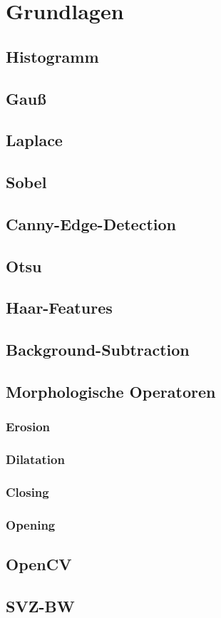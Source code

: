 \chapter{Grundlagen}

\section{Histogramm}

\section{Gauß}

\section{Laplace}

\section{Sobel}

\section{Canny-Edge-Detection}

\section{Otsu}

\section{Haar-Features}

\section{Background-Subtraction}

\section{Morphologische Operatoren}
\subsection{Erosion}
\subsection{Dilatation}
\subsection{Closing}
\subsection{Opening}

\section{OpenCV}

\section{SVZ-BW}